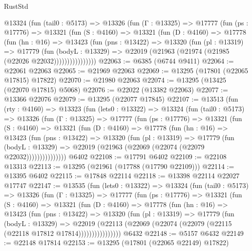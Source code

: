 \begin{lexlean}{RustStd}
\begin{coremodule}
        @13324
          (fun (tail0 : @5173) =>
          @13326
            (fun (Γ : @13325) =>
            @17777
              (fun (ps : @17776) =>
              @13321
                (fun (S : @4160) =>
                @13321
                  (fun (D : @4160) =>
                  @17778
                    (fun (hn : @16) =>
                    @13423
                      (fun (pns : @13422) =>
                      @13320
                        (fun (pl : @13319) =>
                        @17779
                          (fun (bodyL : @13329) =>
                          @22019 (@21963 (@21974 (@21985 (@22026 @22032))))))))))))))))
@22063 := @6385 (@6744 @9411)
@22064 := @22061 @22063
@22065 := @21969 @22063
@22069 := @13295 (@17801 (@22065 @17815) @17822)
@22070 := @21980 @22063
@22074 := @13295 (@13425 (@22070 @17815) @5068)
@22076 := @22022 (@13382 @22063)
@22077 := @13366 @22076
@22079 := @13295 (@22077 @17845)
@22107 := @13513
    (fun (rty : @4160) =>
    @13323
      (fun (lets0 : @13322) =>
      @13324
        (fun (tail0 : @5173) =>
        @13326
          (fun (Γ : @13325) =>
          @17777
            (fun (ps : @17776) =>
            @13321
              (fun (S : @4160) =>
              @13321
                (fun (D : @4160) =>
                @17778
                  (fun (hn : @16) =>
                  @13423
                    (fun (pns : @13422) =>
                    @13320
                      (fun (pl : @13319) =>
                      @17779
                        (fun (bodyL : @13329) =>
                        @22019 (@21963 (@22069 (@22074 (@22079 @22032)))))))))))))))
    @6402
@22108 := @17791 @6402
@22109 := @22108 @13313
@22113 := @13295 (@21961 (@17788 (@17790 @22109)))
@22114 := @13395 @6402
@22115 := @17848 @22114
@22118 := @13398 @22114 @22027 @17747
@22147 := @13535
    (fun (lets0 : @13322) =>
    @13324
      (fun (tail0 : @5173) =>
      @13326
        (fun (Γ : @13325) =>
        @17777
          (fun (ps : @17776) =>
          @13321
            (fun (S : @4160) =>
            @13321
              (fun (D : @4160) =>
              @17778
                (fun (hn : @16) =>
                @13423
                  (fun (pns : @13422) =>
                  @13320
                    (fun (pl : @13319) =>
                    @17779
                      (fun (bodyL : @13329) =>
                      @22019
                        (@22113
                          (@22069 (@22074 (@22079 (@22115 (@22118 @17812 @17814))))))))))))))))
    @6432
@22148 := @5157 @6432
@22149 := @22148 @17814
@22153 := @13295 (@17801 (@22065 @22149) @17822)

\end{coremodule}
\end{lexlean}
